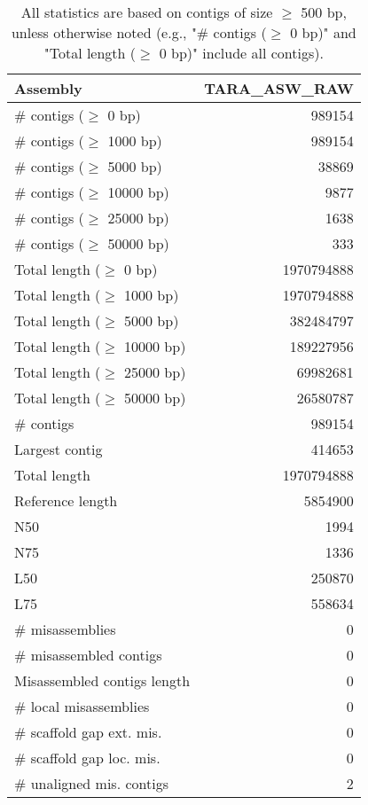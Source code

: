 \documentclass[12pt,a4paper]{article}
\begin{document}
\begin{table}[ht]
\begin{center}
\caption{All statistics are based on contigs of size $\geq$ 500 bp, unless otherwise noted (e.g., "\# contigs ($\geq$ 0 bp)" and "Total length ($\geq$ 0 bp)" include all contigs).}
\begin{tabular}{|l*{1}{|r}|}
\hline
Assembly & TARA\_ASW\_RAW \\ \hline
\# contigs ($\geq$ 0 bp) & 989154 \\ \hline
\# contigs ($\geq$ 1000 bp) & 989154 \\ \hline
\# contigs ($\geq$ 5000 bp) & 38869 \\ \hline
\# contigs ($\geq$ 10000 bp) & 9877 \\ \hline
\# contigs ($\geq$ 25000 bp) & 1638 \\ \hline
\# contigs ($\geq$ 50000 bp) & 333 \\ \hline
Total length ($\geq$ 0 bp) & 1970794888 \\ \hline
Total length ($\geq$ 1000 bp) & 1970794888 \\ \hline
Total length ($\geq$ 5000 bp) & 382484797 \\ \hline
Total length ($\geq$ 10000 bp) & 189227956 \\ \hline
Total length ($\geq$ 25000 bp) & 69982681 \\ \hline
Total length ($\geq$ 50000 bp) & 26580787 \\ \hline
\# contigs & 989154 \\ \hline
Largest contig & 414653 \\ \hline
Total length & 1970794888 \\ \hline
Reference length & 5854900 \\ \hline
N50 & 1994 \\ \hline
N75 & 1336 \\ \hline
L50 & 250870 \\ \hline
L75 & 558634 \\ \hline
\# misassemblies & 0 \\ \hline
\# misassembled contigs & 0 \\ \hline
Misassembled contigs length & 0 \\ \hline
\# local misassemblies & 0 \\ \hline
\# scaffold gap ext. mis. & 0 \\ \hline
\# scaffold gap loc. mis. & 0 \\ \hline
\# unaligned mis. contigs & 2 \\ \hline

\end{tabular}
\end{center}
\end{table}
\end{document}
